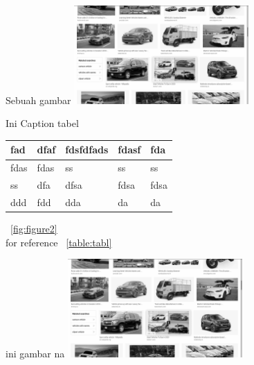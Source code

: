 \begin{afigure}{Sebuah gambar}
    \label{fig:figure2}
    \includegraphics[width=0.5\textwidth, center]{images/input.png}
\end{afigure}

\begin{atable}{Ini Caption tabel}
    \label{table:tabl}
    \begin{tabular}{|l|l|l|l|l|}
    \hline
    fad  & dfaf & fdsfdfads & fdasf & fda  \\
    \hline
    fdas & fdas & ss        & ss    & ss   \\
    \hline
    ss   & dfa  & dfsa      & fdsa  & fdsa \\
    \hline
    ddd  & fdd  & dda       & da    & da \\
    \hline
    \end{tabular}
\end{atable}

\blindtext
~\ref{fig:figure2}
\\
for reference ~\ref{table:tabl}

\begin{afigure}{ini gambar na}
    \label{fig:f1}
    \includegraphics[width=0.5\textwidth, center]{images/input.png}
\end{afigure}
